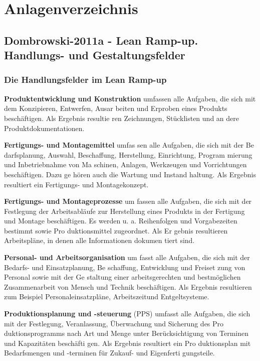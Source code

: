 \chapter{Anlagenverzeichnis}

\section{Dombrowski-2011a - Lean Ramp-up. Handlungs- und Gestaltungsfelder}
\subsection{Die Handlungsfelder im Lean Ramp-up}\label{appendix:dom11a:hf}

\textbf{Produktentwicklung und Konstruktion}
umfassen alle Aufgaben, die sich mit
dem Konzipieren, Entwerfen, Ausar
beiten und Erproben eines Produkts
beschäftigen. Als Ergebnis resultie
ren Zeichnungen, Stücklisten und an
dere Produktdokumentationen.

\textbf{Fertigungs- und Montagemittel} umfas
sen alle Aufgaben, die sich mit der Be
darfsplanung, Auswahl, Beschaffung,
Herstellung, Einrichtung, Program
mierung und Inbetriebnahme von Ma
schinen, Anlagen, Werkzeugen und
Vorrichtungen beschäftigen. Dazu ge
hören auch die Wartung und Instand
haltung. Als Ergebnis resultiert ein
Fertigungs- und Montagekonzept.

\textbf{Fertigungs- und Montageprozesse} um
fassen alle Aufgaben, die sich mit der
Festlegung der Arbeitsabläufe zur
Herstellung eines Produkts in der
Fertigung und Montage beschäftigen.
Es werden u. a. Reihenfolgen und
Vorgabezeiten bestimmt sowie Pro
duktionsmittel zugeordnet. Als Er
gebnis resultieren Arbeitspläne, in
denen alle Informationen dokumen
tiert sind.

\textbf{Personal- und Arbeitsorganisation} um
fasst alle Aufgaben, die sich mit der
Bedarfs- und Einsatzplanung, Be
schaffung, Entwicklung und Freiset
zung von Personal sowie mit der Ge
staltung einer arbeitsgerechten und
bestmöglichen Zusammenarbeit von
Mensch und Technik beschäftigen.
Als Ergebnis resultieren zum Beispiel
Personaleinsatzpläne,
 Arbeitszeitund Entgeltsysteme.

\textbf{Produktionsplanung und -steuerung}
(PPS) umfasst alle Aufgaben, die sich
mit der Festlegung, Veranlassung,
Überwachung und Sicherung des Pro
duktionsprogramms nach Art und
Menge unter Berücksichtigung von
Terminen und Kapazitäten beschäfti
gen. Als Ergebnis resultiert ein Pro
duktionsplan mit Bedarfsmengen und
-terminen für Zukauf- und Eigenferti
gungsteile.

